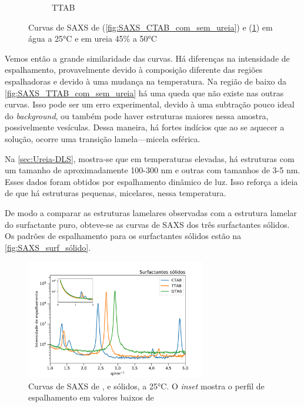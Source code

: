 \begin{figure}[h]
\begin{subfigure}[t]{0.45\textwidth}
			\caption{TTAB}
			\label{fig:SAXS_TTAB_com_sem_ureia}
		\end{subfigure}
		\caption{Curvas de SAXS de \CTAB{} (\ref{fig:SAXS_CTAB_com_sem_ureia}) e \TTAB{} (\ref{fig:SAXS_TTAB_com_sem_ureia}) em água a 25°C e em ureia 45\% a 50°C}
		\label{fig:SAXS_com_sem_ureia}
	\end{figure}
	
	Vemos então a grande similaridade das curvas. Há diferenças na intensidade de espalhamento, provavelmente devido à composição diferente das regiões espalhadoras e devido à uma mudança na temperatura. Na região de baixo \q{} da \autoref{fig:SAXS_TTAB_com_sem_ureia} há uma queda que não existe nas outras curvas. Isso pode ser um erro experimental, devido à uma subtração pouco ideal do \emph{background}, ou também pode haver estruturas maiores nessa amostra, possivelmente vesículas. Dessa maneira, há fortes indícios que ao se aquecer a solução, ocorre uma transição lamela---micela esférica.
	
	Na \autoref{sec:Ureia-DLS}, mostra-se que em temperaturas elevadas, há estruturas com um tamanho de aproximadamente 100-300 nm e outras com tamanhos de 3-5 nm. Esses dados foram obtidos por espalhamento dinâmico de luz. Isso reforça a ideia de que há estruturas pequenas, micelares, nessa temperatura.

	 
	De modo a comparar as estruturas lamelares observadas com a estrutura lamelar do surfactante puro, obteve-se as curvas de SAXS dos três surfactantes sólidos. Os padrões de espalhamento para os surfactantes sólidos estão na \autoref{fig:SAXS_surf_sólido}.

	\begin{figure}[h]
		\centering
		\includegraphics[width=0.7\textwidth]{imagens/saxs/surfactante_solido}
		\caption{Curvas de SAXS de \CTAB{}, \TTAB{} e \DTAB{} sólidos, a 25°C. O \emph{inset} mostra o perfil de espalhamento em valores baixos de \q}
		\label{fig:SAXS_surf_sólido}
	\end{figure}  %
	
